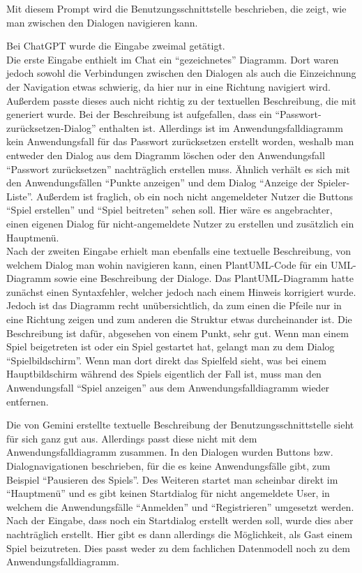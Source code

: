 Mit diesem Prompt wird die Benutzungsschnittstelle beschrieben, die zeigt, wie man zwischen den Dialogen navigieren kann.

Bei ChatGPT wurde die Eingabe zweimal getätigt.\\
Die erste Eingabe enthielt im Chat ein ``gezeichnetes'' Diagramm. Dort waren jedoch sowohl die Verbindungen zwischen den 
Dialogen als auch die Einzeichnung der Navigation etwas schwierig, da hier nur in eine Richtung navigiert wird. Außerdem 
passte dieses auch nicht richtig zu der textuellen Beschreibung, die mit generiert wurde. Bei der Beschreibung ist aufgefallen, 
dass ein ``Passwort-zurücksetzen-Dialog'' enthalten ist. Allerdings ist im Anwendungsfalldiagramm kein Anwendungsfall für das 
Passwort zurücksetzen erstellt worden, weshalb man entweder den Dialog aus dem Diagramm löschen oder den Anwendungsfall 
``Passwort zurücksetzen'' nachträglich erstellen muss. Ähnlich verhält es sich mit den Anwendungsfällen ``Punkte anzeigen'' und dem 
Dialog ``Anzeige der Spieler-Liste''. Außerdem ist fraglich, ob ein noch nicht angemeldeter Nutzer die Buttons ``Spiel erstellen'' 
und ``Spiel beitreten'' sehen soll. Hier wäre es angebrachter, einen eigenen Dialog für nicht-angemeldete Nutzer zu erstellen und 
zusätzlich ein Hauptmenü.\\
Nach der zweiten Eingabe erhielt man ebenfalls eine textuelle Beschreibung, von welchem Dialog man wohin navigieren kann, einen 
PlantUML-Code für ein UML-Diagramm sowie eine Beschreibung der Dialoge. Das PlantUML-Diagramm hatte zunächst einen Syntaxfehler, 
welcher jedoch nach einem Hinweis korrigiert wurde. Jedoch ist das Diagramm recht unübersichtlich, da zum einen die Pfeile nur in 
eine Richtung zeigen und zum anderen die Struktur etwas durcheinander ist. Die Beschreibung ist dafür, abgesehen von einem Punkt, 
sehr gut. Wenn man einem Spiel beigetreten ist oder ein Spiel gestartet hat, gelangt man zu dem Dialog ``Spielbildschirm''. Wenn man 
dort direkt das Spielfeld sieht, was bei einem Hauptbildschirm während des Spiels eigentlich der Fall ist, muss man den Anwendungsfall 
``Spiel anzeigen'' aus dem Anwendungsfalldiagramm wieder entfernen.

Die von Gemini erstellte textuelle Beschreibung der Benutzungsschnittstelle sieht für sich ganz gut aus. Allerdings passt diese nicht 
mit dem Anwendungsfalldiagramm zusammen. In den Dialogen wurden Buttons bzw. Dialognavigationen beschrieben, für die es keine 
Anwendungsfälle gibt, zum Beispiel ``Pausieren des Spiels''. Des Weiteren startet man scheinbar direkt im ``Hauptmenü'' und es gibt keinen 
Startdialog für nicht angemeldete User, in welchem die Anwendungsfälle ``Anmelden'' und ``Registrieren'' umgesetzt werden. Nach der Eingabe, 
dass noch ein Startdialog erstellt werden soll, wurde dies aber nachträglich erstellt. Hier gibt es dann allerdings die Möglichkeit, 
als Gast einem Spiel beizutreten. Dies passt weder zu dem fachlichen Datenmodell noch zu dem Anwendungsfalldiagramm.

